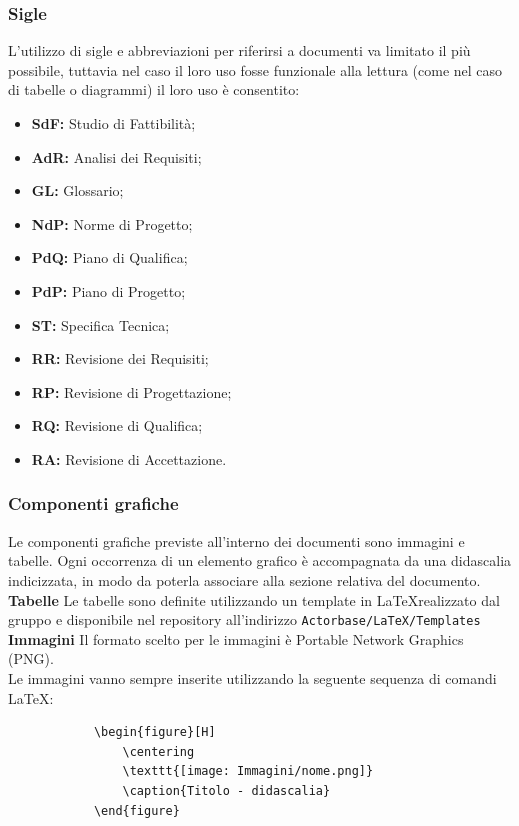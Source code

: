 \documentclass[a4paper]{article}
\begin{document}
		\subsubsection{Sigle}
		L'utilizzo di sigle e abbreviazioni per riferirsi a documenti va limitato il più possibile, tuttavia nel caso il loro uso
		fosse funzionale alla lettura (come nel caso di tabelle o diagrammi) il loro uso è consentito:
		\begin{itemize}
			\item \textbf{SdF:} Studio di Fattibilità;
			\item \textbf{AdR:} Analisi dei Requisiti;
			\item \textbf{GL:} Glossario;
			\item \textbf{NdP:} Norme di Progetto;
			\item \textbf{PdQ:} Piano di Qualifica;
			\item \textbf{PdP:} Piano di Progetto;
			\item \textbf{ST:} Specifica Tecnica;
			\item \textbf{RR:} Revisione dei Requisiti;
			\item \textbf{RP:} Revisione di Progettazione;
			\item \textbf{RQ:} Revisione di Qualifica;
			\item \textbf{RA:} Revisione di Accettazione.
		\end{itemize}
		\subsubsection{Componenti grafiche}
		Le componenti grafiche previste all'interno dei documenti sono immagini e tabelle. Ogni occorrenza di un
		elemento grafico è accompagnata da una didascalia indicizzata, in modo da poterla associare alla sezione
		relativa del documento.
		\textbf{Tabelle}
		Le tabelle sono definite utilizzando un template in \LaTeX \space realizzato dal gruppo e disponibile nel
		repository all'indirizzo \verb|Actorbase/LaTeX/Templates|
		\textbf{Immagini}
		Il formato scelto per le immagini è Portable Network Graphics (PNG). \\
		Le immagini vanno sempre inserite utilizzando la seguente sequenza di comandi \LaTeX:
		\begin{verbatim}
			\begin{figure}[H]
				\centering
				\texttt{[image: Immagini/nome.png]}
				\caption{Titolo - didascalia}
			\end{figure}
		\end{verbatim}
\end{document}
